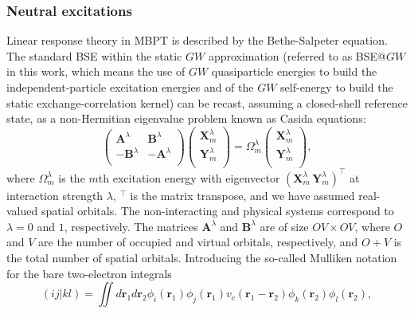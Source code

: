 \documentclass[aps,prb,reprint,superscriptaddress]{revtex4-1}
\newcommand{\br}{\boldsymbol{r}}
\newcommand{\dbr}{d\br}
\newcommand{\Occ}{O}
\newcommand{\Vir}{V}
\newcommand{\IS}{\lambda}
\newcommand{\T}[1]{#1^{\intercal}}
\newcommand{\MO}[1]{\phi_{#1}}
\newcommand{\ERI}[2]{(#1|#2)}
\newcommand{\Om}[2]{\Omega_{#1}^{#2}}
\newcommand{\bA}[1]{\boldsymbol{A}^{#1}}
\newcommand{\bB}[1]{\boldsymbol{B}^{#1}}
\newcommand{\bX}[1]{\boldsymbol{X}^{#1}}
\newcommand{\bY}[1]{\boldsymbol{Y}^{#1}}
\begin{document}
\subsubsection{Neutral excitations}
Linear response theory \citep{Oddershede_1977,Casida_1995,Petersilka_1996} in MBPT is described by the Bethe-Salpeter equation. \citep{Strinati_1988} 
The standard BSE within the static $GW$ approximation (referred to as BSE@$GW$ in this work, which means the use of $GW$ quasiparticle energies to build the independent-particle excitation energies and of the $GW$ self-energy to build the static exchange-correlation kernel) can be recast, assuming a closed-shell reference state, as a non-Hermitian eigenvalue problem known as Casida equations:
\begin{equation}
	\begin{pmatrix}
		\bA{\IS}	&	\bB{\IS}	\\
		-\bB{\IS}	&	-\bA{\IS}	\\
	\end{pmatrix}
	\begin{pmatrix}
		\bX{\IS}_m	\\
		\bY{\IS}_m	\\
	\end{pmatrix}
	=
	\Om{m}{\IS}
	\begin{pmatrix}
		\bX{\IS}_m	\\
		\bY{\IS}_m	\\
	\end{pmatrix},
	\label{Eqn:EIGENVALUE_PB}
\end{equation}
where $\Om{m}{\IS}$ is the $m$th excitation energy with eigenvector $\T{(\bX{\IS}_m \, \bY{\IS}_m)}$ at interaction strength $\IS$, $\T{}$ is the matrix transpose, and we have assumed real-valued spatial orbitals. The non-interacting and physical systems correspond to $\IS = 0$ and $1$, respectively. 
The matrices $\bA{\IS}$ and $\bB{\IS}$ are of size $\Occ \Vir \times \Occ \Vir$, where $\Occ$ and $\Vir$ are the number of occupied and virtual orbitals, respectively, and $\Occ + \Vir$ is the total number of spatial orbitals.
Introducing the so-called Mulliken notation for the bare two-electron integrals
\begin{equation}
	\ERI{ij}{kl} = \iint \dbr_1 \dbr_2 \MO{i}(\br_1) \MO{j}(\br_1) v_c(\br_1-\br_2)\MO{k}(\br_2) \MO{l}(\br_2),
\end{equation}
\end{document}
